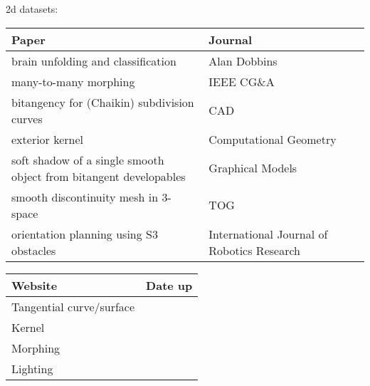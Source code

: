 \documentclass[12pt]{article}
\begin{document}
2d datasets:
          

	  

\begin{table}[h]
\begin{tabular}{lll}
Paper & Journal \\ \hline
brain unfolding and classification & Alan Dobbins \\
many-to-many morphing & IEEE CG\&A \\
bitangency for (Chaikin) subdivision curves & CAD \\
exterior kernel & Computational Geometry \\
soft shadow of a single smooth object from bitangent developables & Graphical Models \\
smooth discontinuity mesh in 3-space & TOG \\
orientation planning using S3 obstacles & International Journal of Robotics Research \\
\end{tabular}
\end{table}

\begin{table}[h]
\begin{tabular}{ll}
Website & Date up \\ \hline
Tangential curve/surface \\
Kernel \\
Morphing \\
Lighting \\
\end{tabular}
\end{table}
\end{document}

